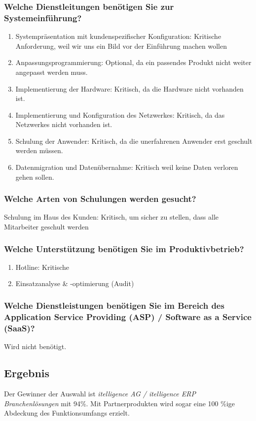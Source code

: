 \subsubsection{Welche Dienstleitungen benötigen Sie zur Systemeinführung?}
\begin{enumerate}
	\item Systempräsentation mit kundenspezifischer Konfiguration: Kritische Anforderung, weil wir uns ein Bild vor der Einführung machen wollen
	\item Anpassungsprogrammierung: Optional, da ein passendes Produkt nicht weiter angepasst werden muss.
	\item Implementierung der Hardware: Kritisch, da die Hardware nicht vorhanden ist.
	\item Implementierung und Konfiguration des Netzwerkes: Kritisch, da das Netzwerkes nicht vorhanden ist.
	\item Schulung der Anwender: Kritisch, da die unerfahrenen Anwender erst geschult werden müssen.
	\item Datenmigration und Datenübernahme: Kritisch weil keine Daten verloren gehen sollen.
\end{enumerate}
\subsubsection{Welche Arten von Schulungen werden gesucht?}
Schulung im Haus des Kunden: Kritisch, um sicher zu stellen, dass alle Mitarbeiter geschult werden

\subsubsection{Welche Unterstützung benötigen Sie im Produktivbetrieb?}
\begin{enumerate}
	\item Hotline: Kritische
	\item Einsatzanalyse \& -optimierung (Audit)
\end{enumerate}

\subsubsection{Welche Dienstleistungen benötigen Sie im Bereich des Application Service Providing (ASP) / Software as a Service (SaaS)?}
Wird nicht benötigt.
\newpage
\subsection{Ergebnis}
Der Gewinner der Auswahl ist \textit{itelligence AG / itelligence ERP Branchenlösungen} mit 94\%. Mit Partnerprodukten wird sogar eine 100 \%ige Abdeckung des Funktionsumfangs erzielt. 

